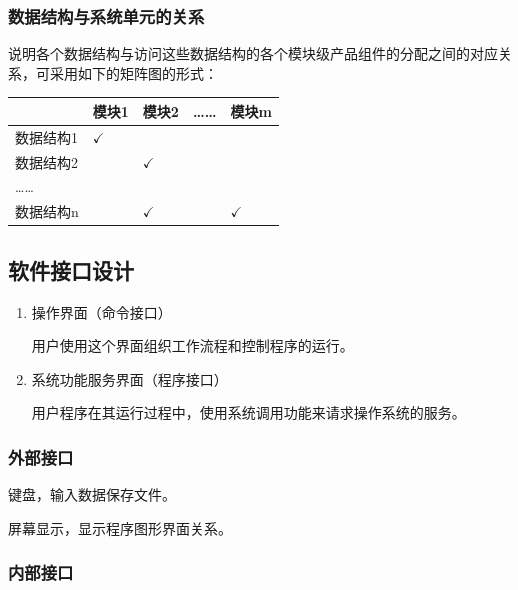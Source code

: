 \documentclass[UTF8,a4paper,12pt]{ctexart}
\begin{document}
\subsubsection{数据结构与系统单元的关系}

说明各个数据结构与访问这些数据结构的各个模块级产品组件的分配之间的对应关系，可采用如下的矩阵图的形式：

\begin{center}
\renewcommand{\arraystretch}{1.35}
\begin{tabularx}{0.95\textwidth}{|>{\centering\arraybackslash}p{3cm}|>{\centering\arraybackslash}X|>{\centering\arraybackslash}X|>{\centering\arraybackslash}X|>{\centering\arraybackslash}X|}
\hline
 & \textbf{模块1} & \textbf{模块2} & \textbf{……} & \textbf{模块m} \\
\hline
数据结构1 & $\checkmark$ & & & \\
\hline
数据结构2 & & $\checkmark$ & & \\
\hline
…… & & & & \\
\hline
数据结构n & & $\checkmark$ & & $\checkmark$ \\
\hline
\end{tabularx}
\end{center}

\subsection{软件接口设计}

\begin{enumerate}[label=(\arabic*)]
    \item 操作界面（命令接口）

    用户使用这个界面组织工作流程和控制程序的运行。

    \item 系统功能服务界面（程序接口）

    用户程序在其运行过程中，使用系统调用功能来请求操作系统的服务。
\end{enumerate}

\subsubsection{外部接口}

键盘，输入数据保存文件。

屏幕显示，显示程序图形界面关系。

\subsubsection{内部接口}
\end{document}
